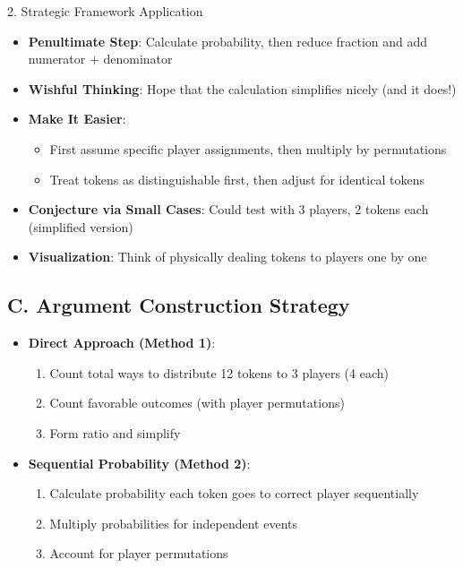 \documentclass[12pt]{article}
\begin{document}
\begin{strategybox}{2. Strategic Framework Application}
\begin{itemize}[leftmargin=*]
    \item \textbf{Penultimate Step}: Calculate probability, then reduce fraction and add numerator + denominator
    
    \item \textbf{Wishful Thinking}: Hope that the calculation simplifies nicely (and it does!)
    
    \item \textbf{Make It Easier}: 
    \begin{itemize}
        \item First assume specific player assignments, then multiply by permutations
        \item Treat tokens as distinguishable first, then adjust for identical tokens
    \end{itemize}
    
    \item \textbf{Conjecture via Small Cases}: Could test with 3 players, 2 tokens each (simplified version)
    
    \item \textbf{Visualization}: Think of physically dealing tokens to players one by one
\end{itemize}

\subsection*{C. Argument Construction Strategy}
\begin{itemize}[leftmargin=*]
    \item \textbf{Direct Approach (Method 1)}: 
    \begin{enumerate}
        \item Count total ways to distribute 12 tokens to 3 players (4 each)
        \item Count favorable outcomes (with player permutations)
        \item Form ratio and simplify
    \end{enumerate}
    
    \item \textbf{Sequential Probability (Method 2)}:
    \begin{enumerate}
        \item Calculate probability each token goes to correct player sequentially
        \item Multiply probabilities for independent events
        \item Account for player permutations
    \end{enumerate}
    

\end{itemize}
\end{strategybox}
\end{document}
